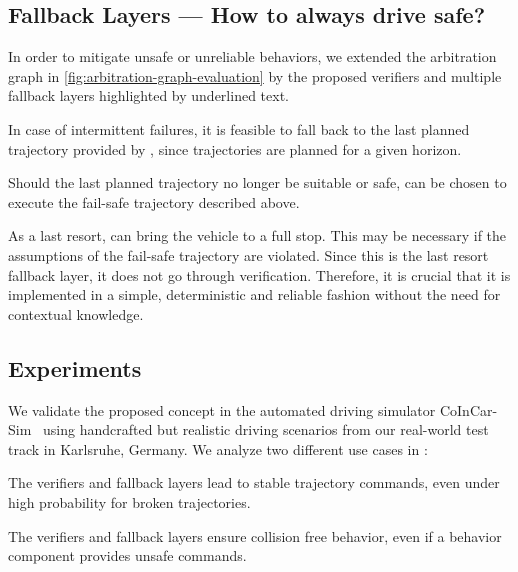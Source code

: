 


\subsection{Fallback Layers --- How to always \textbf{drive safe}?}

In order to mitigate unsafe or unreliable behaviors,
we extended the arbitration graph in \cref{fig:arbitration-graph-evaluation}
by the proposed verifiers and multiple fallback layers
highlighted by underlined text.

In case of intermittent failures,
it is feasible to fall back to the last planned trajectory
provided by ,
since trajectories are planned for a given horizon.

Should the last planned trajectory no longer be suitable or safe,
 can be chosen to execute the fail-safe trajectory described above.

As a last resort,  can bring the vehicle to a full stop.
This may be necessary if the assumptions of the fail-safe trajectory are violated.
%
Since this is the last resort fallback layer,
it does not go through verification.
Therefore, it is crucial that it is implemented in a simple, deterministic and reliable fashion
without the need for contextual knowledge.




\subsection{Experiments}

We validate the proposed concept in the automated driving simulator CoInCar-Sim~\cite{naumannCoInCarSimOpenSourceSimulation2018}
using handcrafted but realistic driving scenarios
from our real-world test track in Karlsruhe, Germany.
We analyze two different use cases
in \cite{orzechowskiVerhaltensentscheidungFuerAutomatisierte2023}:
%
\begin{description}[align=left]
    \item[Ensuring driveability]
        The verifiers and fallback layers lead to stable trajectory commands,
        even under high probability for broken trajectories.
    \item[Guaranteeing vehicle safety]
        The verifiers and fallback layers ensure collision free behavior,
        even if a behavior component provides unsafe commands.
\end{description}

